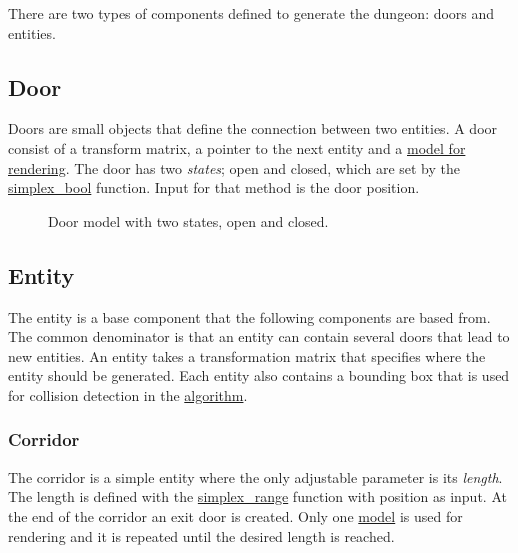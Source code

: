 \documentclass[a4paper]{article}
\begin{document}
There are two types of components defined to generate the dungeon: doors and entities.


\subsection{Door%
  \label{door}%
}

Doors are small objects that define the connection between two entities. A door consist of a transform matrix, a pointer to the next entity and a \hyperref[door-model]{model for rendering}. The door has two \emph{states}; open and closed, which are set by the \hyperref[simplex-bool]{simplex\_bool} function. Input for that method is the door position.

\begin{figure}
\noindent{}\label{door-model}

\caption{Door model with two states, open and closed.}
\end{figure}


\subsection{Entity%
  \label{entity}%
}

The entity is a base component that the following components are based from. The
common denominator is that an entity can contain several doors that lead to new entities. An entity takes a transformation matrix that specifies where the entity should be generated. Each entity also contains a bounding box that is used for collision detection in the \hyperref[algorithm]{algorithm}.


\subsubsection{Corridor%
  \label{corridor}%
}

The corridor is a simple entity where the only adjustable parameter is its \emph{length}. The length is defined with the \hyperref[simplex-range]{simplex\_range} function with position as input. At the end of the corridor an exit door is created. Only one \hyperref[corridor-model]{model} is used for rendering and it is repeated until the desired length is reached.
\end{document}
